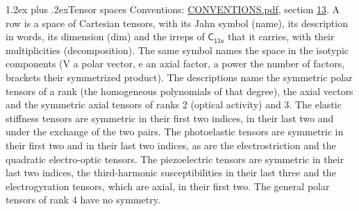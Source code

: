 \documentclass[10pt,a4paper]{article}
\makeatletter
\renewcommand\section{\@startsection{section}{1}{\z@}{-3ex plus -1ex minus -.2ex}%
  {1.2ex plus .2ex}{\normalfont\large\sffamily\bfseries\color{parttitle}}}
\numberwithin{equation}{section}
\newcommand{\grp}[1]{\mathsf{#1}}
\makeatother
\begin{document}
\section{Tensor spaces}\label{s:tensor_spaces}
Conventions: \href{../../CONVENTIONS.pdf}{CONVENTIONS.pdf}, section \href{../../CONVENTIONS.pdf\#conv.13}{13}.
\leavevmode\label{n:head.name}\label{n:head.description}\label{n:head.dim}\label{n:head.decomposition}A row is a space of Cartesian tensors, with its Jahn symbol (name), its description in words, its dimension (dim) and the irreps of $\grp{C_{11v}}$ that it carries, with their multiplicities (decomposition). \label{n:label.jahn}The same symbol names the space in the isotypic components (V a polar vector, e an axial factor, a power the number of factors, brackets their symmetrized product). The descriptions name the symmetric polar tensors of a rank (the homogeneous polynomials of that degree), the axial vectors and the symmetric axial tensors of ranks 2 (optical activity) and 3. The elastic stiffness tensors are symmetric in their first two indices, in their last two and under the exchange of the two pairs. The photoelastic tensors are symmetric in their first two and in their last two indices, as are the electrostriction and the quadratic electro-optic tensors. The piezoelectric tensors are symmetric in their last two indices, the third-harmonic susceptibilities in their last three and the electrogyration tensors, which are axial, in their first two. The general polar tensors of rank 4 have no symmetry.
\end{document}
